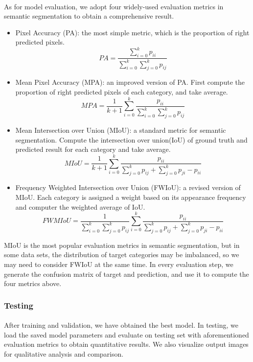 \paragraph{}
As for model evaluation, we adopt four widely-used evaluation metrics in semantic segmentation to obtain a comprehensive result.
\begin{itemize}
    \item Pixel Accuracy (PA): the most simple metric, which is the proportion of right predicted pixels. \[PA = \frac{\sum_{i=0}^k{p_{ii}}}{\sum_{i=0}^k\sum_{j=0}^k{p_{ij}}}\] 
    \item Mean Pixel Accuracy (MPA): an improved version of PA. First compute the proportion of right predicted pixels of each category, and take average. \[MPA = \frac{1}{k+1}\sum_{i=0}^k\frac{p_{ii}}{\sum_{i=0}^k\sum_{j=0}^k{p_{ij}}}\] 
    \item Mean Intersection over Union (MIoU): a standard metric for semantic segmentation. Compute the intersection over union(IoU) of ground truth and predicted result for each category and take average. \[MIoU = \frac{1}{k+1}\sum_{i=0}^k\frac{{p_{ii}}}{\sum_{j=0}^k{p_{ij}}+\sum_{j=0}^k{p_{ji}}-p_{ii}}\]
    \item Frequency Weighted Intersection over Union (FWIoU): a revised version of MIoU. Each category is assigned a weight based on its appearance frequency and computer the weighted average of IoU. \[FWMIoU = \frac{1}{\sum_{i=0}^k\sum_{j=0}^k{p_{ij}}}\sum_{i=0}^k\frac{{p_{ii}}}{\sum_{j=0}^k{p_{ij}}+\sum_{j=0}^k{p_{ji}}-p_{ii}}\]
\end{itemize}
MIoU is the most popular evaluation metrics in semantic segmentation, but in some data sets, the distribution of target categories may be imbalanced, so we may need to consider FWIoU at the same time. In every evaluation step, we generate the confusion matrix of target and prediction, and use it to compute the four metrics above.
\subsubsection{Testing}
\paragraph{}
After training and validation, we have obtained the best model. In testing, we load the saved model parameters and evaluate on testing set with aforementioned evaluation metrics to obtain quantitative results. We also visualize output images for qualitative analysis and comparison.
